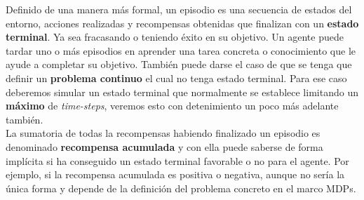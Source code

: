\documentclass[11pt,fleqn]{book} %
\begin{document}
Definido de una manera más formal, un episodio es una secuencia de estados del entorno, acciones realizadas y recompensas obtenidas que finalizan con un \textbf{estado terminal}. Ya sea fracasando o teniendo éxito en su objetivo. Un agente puede tardar uno o más episodios en aprender una tarea concreta o conocimiento que le ayude a completar su objetivo. También puede darse el caso de que se tenga que definir un \textbf{problema continuo} el cual no tenga estado terminal. Para ese caso deberemos simular un estado terminal que normalmente se establece limitando un \textbf{máximo} de \textit{time-steps}, veremos esto con detenimiento un poco más adelante también. \\

La sumatoria de todas la recompensas habiendo finalizado un episodio es denominado \textbf{recompensa acumulada} y con ella puede saberse de forma implícita si ha conseguido un estado terminal favorable o no para el agente. Por ejemplo, si la recompensa acumulada es positiva o negativa, aunque no sería la única forma y depende de la definición del problema concreto en el marco MDPs. \\
\end{document}
